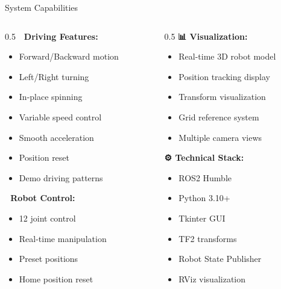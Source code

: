 \documentclass[aspectratio=169]{beamer}
\begin{document}
\begin{frame}{System Capabilities}
\begin{columns}
\begin{column}{0.5\textwidth}
\textbf{🚗 Driving Features:}
\begin{itemize}
    \item Forward/Backward motion
    \item Left/Right turning
    \item In-place spinning
    \item Variable speed control
    \item Smooth acceleration
    \item Position reset
    \item Demo driving patterns
\end{itemize}

\textbf{🦾 Robot Control:}
\begin{itemize}
    \item 12 joint control
    \item Real-time manipulation
    \item Preset positions
    \item Home position reset
\end{itemize}
\end{column}

\begin{column}{0.5\textwidth}
\textbf{📊 Visualization:}
\begin{itemize}
    \item Real-time 3D robot model
    \item Position tracking display
    \item Transform visualization
    \item Grid reference system
    \item Multiple camera views
\end{itemize}

\textbf{⚙️ Technical Stack:}
\begin{itemize}
    \item ROS2 Humble
    \item Python 3.10+
    \item Tkinter GUI
    \item TF2 transforms
    \item Robot State Publisher
    \item RViz visualization
\end{itemize}
\end{column}
\end{columns}
\end{frame}
\end{document}
